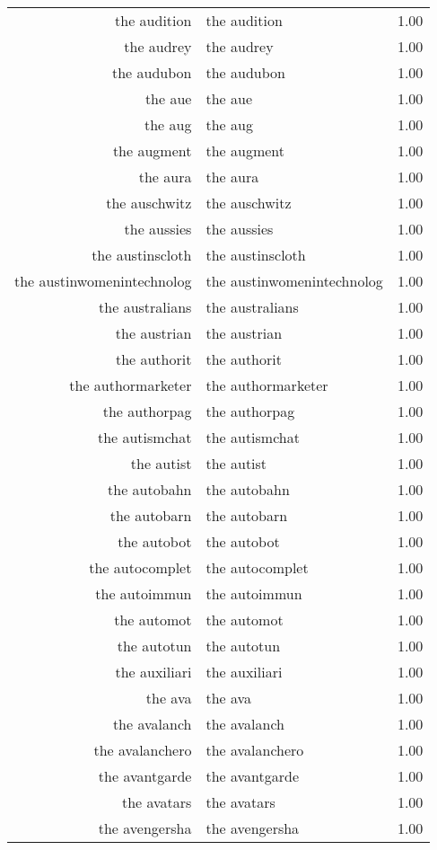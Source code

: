 \begin{table}[ht]
\begin{tabular}{rlr}
  the audition & the audition & 1.00 \\ 
  the audrey & the audrey & 1.00 \\ 
  the audubon & the audubon & 1.00 \\ 
  the aue & the aue & 1.00 \\ 
  the aug & the aug & 1.00 \\ 
  the augment & the augment & 1.00 \\ 
  the aura & the aura & 1.00 \\ 
  the auschwitz & the auschwitz & 1.00 \\ 
  the aussies & the aussies & 1.00 \\ 
  the austinscloth & the austinscloth & 1.00 \\ 
  the austinwomenintechnolog & the austinwomenintechnolog & 1.00 \\ 
  the australians & the australians & 1.00 \\ 
  the austrian & the austrian & 1.00 \\ 
  the authorit & the authorit & 1.00 \\ 
  the authormarketer & the authormarketer & 1.00 \\ 
  the authorpag & the authorpag & 1.00 \\ 
  the autismchat & the autismchat & 1.00 \\ 
  the autist & the autist & 1.00 \\ 
  the autobahn & the autobahn & 1.00 \\ 
  the autobarn & the autobarn & 1.00 \\ 
  the autobot & the autobot & 1.00 \\ 
  the autocomplet & the autocomplet & 1.00 \\ 
  the autoimmun & the autoimmun & 1.00 \\ 
  the automot & the automot & 1.00 \\ 
  the autotun & the autotun & 1.00 \\ 
  the auxiliari & the auxiliari & 1.00 \\ 
  the ava & the ava & 1.00 \\ 
  the avalanch & the avalanch & 1.00 \\ 
  the avalanchero & the avalanchero & 1.00 \\ 
  the avantgarde & the avantgarde & 1.00 \\ 
  the avatars & the avatars & 1.00 \\ 
  the avengersha & the avengersha & 1.00 \\ 

\end{tabular}
\end{table}
